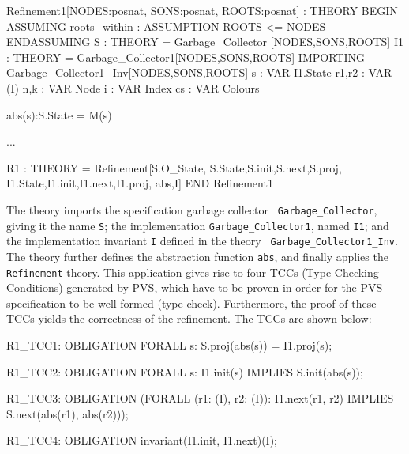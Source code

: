 \begin{smallsession}
Refinement1[NODES:posnat, SONS:posnat, ROOTS:posnat] : THEORY
BEGIN
  ASSUMING
    roots_within : ASSUMPTION ROOTS <= NODES
  ENDASSUMING
  S  : THEORY = Garbage_Collector [NODES,SONS,ROOTS]
  I1 : THEORY = Garbage_Collector1[NODES,SONS,ROOTS]
  IMPORTING Garbage_Collector1_Inv[NODES,SONS,ROOTS]
  s     : VAR I1.State
  r1,r2 : VAR (I)
  n,k   : VAR Node
  i     : VAR Index
  cs    : VAR Colours

  abs(s):S.State = M(s)

  ...

  R1 : THEORY = 
    Refinement[S.O_State,
      S.State,S.init,S.next,S.proj,
      I1.State,I1.init,I1.next,I1.proj,
      abs,I]      
END Refinement1
\end{smallsession}
\label{refinement1}

The   theory   imports  the  specification    garbage  collector  {\tt
  Garbage\_Collector}, giving it the name  {\tt S}; the implementation
{\tt  Garbage\_Collector1},  named  {\tt I1};  and  the implementation
invariant     {\tt     I}    defined     in      the   theory     {\tt
  Garbage\_Collector1\_Inv}\@.    The  theory  further     defines   the
abstraction  function   {\tt  abs}, and    finally  applies the   {\tt
  Refinement} theory.  This application gives rise to four TCCs (Type
Checking Conditions)  generated  by PVS,  which  have to be  proven in
order  for  the PVS  specification  to be  well  formed  (type check)\@. 
Furthermore, the proof  of these TCCs yields  the correctness  of the
refinement.  The TCCs are shown below:

\begin{smallsession}
R1_TCC1: OBLIGATION FORALL s: S.proj(abs(s)) = I1.proj(s);
 
R1_TCC2: OBLIGATION FORALL s: I1.init(s) IMPLIES S.init(abs(s));
 
R1_TCC3: OBLIGATION (FORALL (r1: (I), r2: (I)):
                      I1.next(r1, r2) IMPLIES S.next(abs(r1), abs(r2)));
 
R1_TCC4: OBLIGATION invariant(I1.init, I1.next)(I);
\end{smallsession}
\label{tccs-refinement1}

